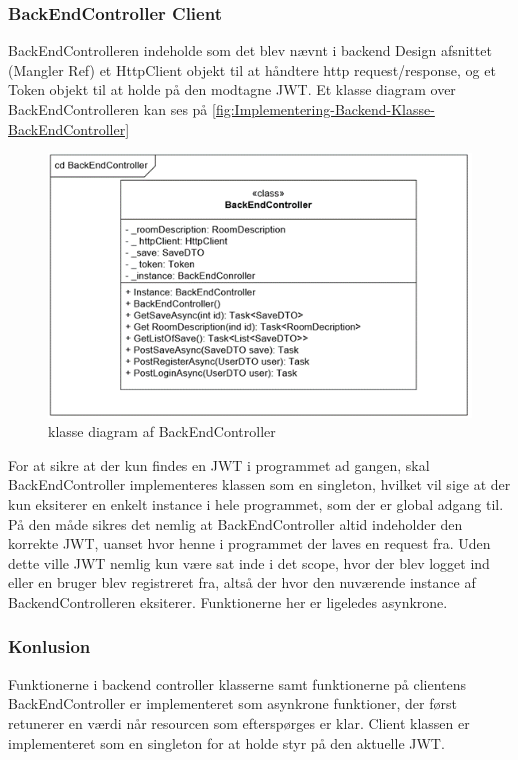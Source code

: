 \subsubsection{BackEndController Client}
BackEndControlleren indeholde som det blev nævnt i backend Design afsnittet (Mangler Ref) et HttpClient objekt til at håndtere http request/response, og et Token objekt til at holde på den modtagne JWT.
Et klasse diagram over BackEndControlleren kan ses på \autoref{fig:Implementering-Backend-Klasse-BackEndController}\\

\begin{figure}[H]
\centering
\includegraphics[width = \textwidth]{02-Body/Images/Backend_klasse_BackEndController.PNG}
\caption{klasse diagram af BackEndController}
\label{fig:Implementering-Backend-Klasse-BackEndController}
\end{figure}

For at sikre at der kun findes en JWT i programmet ad gangen, skal BackEndController implementeres klassen som en singleton, hvilket vil sige at der kun eksiterer en enkelt instance i hele programmet, som der er global adgang til. På den måde sikres det nemlig at BackEndController altid indeholder den korrekte JWT, uanset hvor henne i programmet der laves en request fra. Uden dette ville JWT nemlig kun være sat inde i det scope, hvor der blev logget ind eller en bruger blev registreret fra, altså der hvor den nuværende instance af BackendControlleren eksiterer. Funktionerne her er ligeledes asynkrone.\\


\subsubsection{Konlusion}

Funktionerne i backend controller klasserne samt funktionerne på clientens BackEndController er implementeret som asynkrone funktioner, der først retunerer en værdi når resourcen som efterspørges er klar. Client klassen er implementeret som en singleton for at holde styr på den aktuelle JWT.

\newpage
